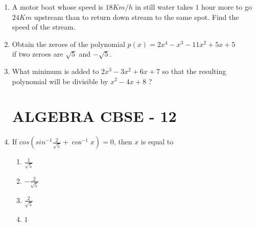 \documentclass[12pt]{article}
\begin{document}
\begin{enumerate}
\item
	A motor boat whose speed is $18 Km/h$ in still water takes $1$ hour more to 
go $24 Km$ upstream than to return down stream to the same spot. Find the speed of the stream.

\item 
	Obtain the zeroes of the polynomial
$p(x) = 2x^4 - x^3 - 11x^2 + 5x + 5$ \\
if two zeroes are $\sqrt5$ and $-\sqrt5$.

\item
	What minimum is added to $2x^3 - 3x^2 + 6x + 7$ so that the resulting
polynomial will be divisible by $x^2 - 4x + 8$ ?

		\section*{ALGEBRA CBSE - 12}
\item
	If $cos\left(sin^{-1}\frac{2}{\sqrt{5}} + \cos^{-1}x \right) = 0$, then $x$ is equal to
\begin{enumerate}
	\item $\frac{1}{\sqrt{5}}$
	\item $-\frac{2}{\sqrt{5}}$
	\item $\frac{2}{\sqrt{5}}$
        \item $1$
\end{enumerate}
\end{enumerate}

	
\end{document}

